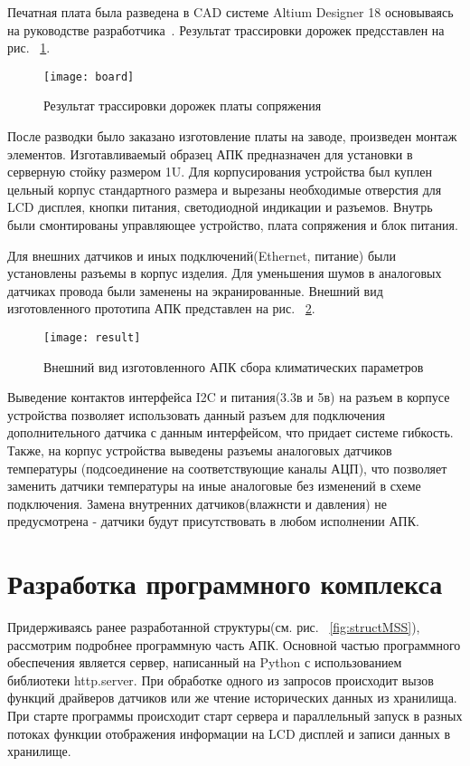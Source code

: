 Печатная плата была разведена в CAD системе Altium Designer 18 основываясь на руководстве разработчика~\cite{altium}. 
Результат трассировки дорожек предсставлен на рис. ~\ref{fig:board}.
\begin{figure}[H]
	\centering
	\texttt{[image: board]}
	\caption{Результат трассировки дорожек платы сопряжения}
	\label{fig:board}
\end{figure}

После разводки было заказано изготовление платы на заводе, произведен монтаж элементов.  
Изготавливаемый образец АПК предназначен для установки в серверную стойку размером 1U. Для корпусирования устройства был куплен цельный корпус стандартного размера и вырезаны необходимые отверстия для LCD дисплея, кнопки питания, светодиодной индикации и разъемов. Внутрь были смонтированы управляющее устройство, плата сопряжения и блок питания. 

Для внешних датчиков и иных подключений(Ethernet, питание) были установлены разъемы в корпус изделия. Для уменьшения шумов в аналоговых датчиках провода были заменены на экранированные. 
Внешний вид изготовленного прототипа АПК представлен на рис. ~\ref{fig:result}.

\begin{figure}[h]
	\centering
	\texttt{[image: result]}
	\caption{Внешний вид изготовленного АПК сбора климатических параметров}
	\label{fig:result}
\end{figure} 

Выведение контактов интерфейса I2C и питания(3.3в и 5в) на разъем в корпусе устройства позволяет использовать данный разъем для подключения дополнительного датчика с данным интерфейсом, что придает системе гибкость. Также, на корпус устройства выведены разъемы аналоговых датчиков температуры (подсоединение на соответствующие каналы АЦП), что позволяет заменить датчики температуры на иные аналоговые без изменений в схеме подключения. Замена внутренних датчиков(влажнсти и давления) не предусмотрена - датчики будут присутствовать в любом исполнении АПК. 


\section{Разработка программного комплекса}
Придерживаясь ранее разработанной структуры(см. рис. ~\ref{fig:structMSS}), рассмотрим подробнее программную часть АПК. 
Основной частью программного обеспечения является сервер, написанный на Python с использованием библиотеки http.server. При обработке одного из запросов происходит вызов функций драйверов датчиков или же чтение исторических данных из хранилища.
При старте программы происходит старт сервера и параллельный запуск в разных потоках функции отображения информации на LCD дисплей и записи данных в хранилище. 

